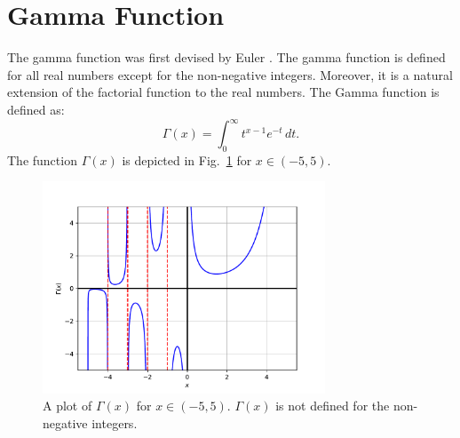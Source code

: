 \documentclass{article}
\theoremstyle{theorem}
\theoremstyle{definition}
\begin{document}
\section{Gamma Function}
The gamma function was first devised by Euler \cite{euler1738}. The gamma function is defined for all real numbers except for the non-negative integers. Moreover, it is a natural extension of the factorial function to the real numbers. The Gamma function is defined as:
\begin{equation}
\Gamma(x) = \int_0^{\infty} t^{x-1} e^{-t}\,dt.
\end{equation}
The function $\Gamma(x)$ is depicted in Fig.~\ref{fig:gamma} for $x\in(-5,5)$.
\begin{figure}[htb]
\centering
\includegraphics[width=0.75\textwidth]{gamma.pdf}
\caption{A plot of $\Gamma(x)$ for $x\in(-5,5)$. $\Gamma(x)$ is not defined for the non-negative integers.}
\label{fig:gamma}
\end{figure}
\end{document}
